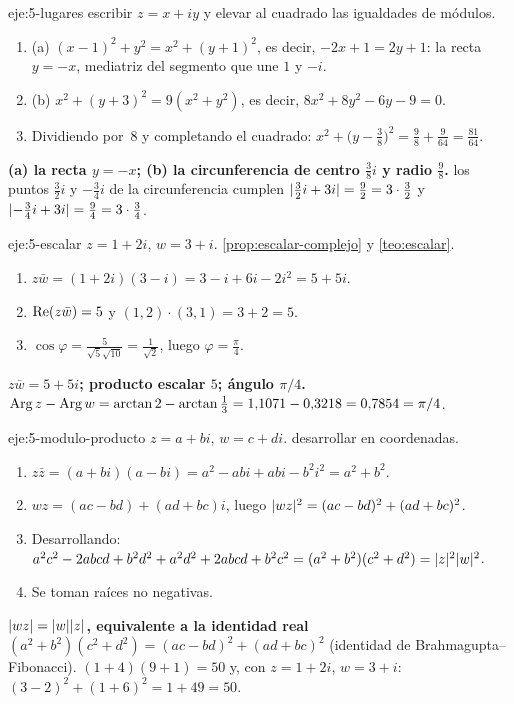 \begin{solucion}{eje:5-lugares}
\planteamiento escribir $z=x+iy$ y elevar al cuadrado las igualdades de módulos.
\pasos
\begin{enumerate}[label=\arabic*.]
  \item (a) $(x-1)^{2}+y^{2}=x^{2}+(y+1)^{2}$, es decir, $-2x+1=2y+1$: la recta $y=-x$, mediatriz del segmento que une $1$ y $-i$.
  \item (b) $x^{2}+(y+3)^{2}=9(x^{2}+y^{2})$, es decir, $8x^{2}+8y^{2}-6y-9=0$.
  \item Dividiendo por~8 y completando el cuadrado: $x^{2}+\bigl(y-\frac38\bigr)^{2}=\frac98+\frac{9}{64}=\frac{81}{64}$.
\end{enumerate}
\resultado \textbf{(a) la recta $y=-x$; (b) la circunferencia de centro $\frac38i$ y radio $\frac98$.}
\comprobacion los puntos $\frac32i$ y $-\frac34i$ de la circunferencia cumplen $\lvert\frac32i+3i\rvert=\frac92=3\cdot\frac32$ y $\lvert-\frac34i+3i\rvert=\frac94=3\cdot\frac34$.
\end{solucion}

\begin{solucion}{eje:5-escalar}
\datos $z=1+2i$, $w=3+i$.
\planteamiento \cref{prop:escalar-complejo} y \cref{teo:escalar}.
\pasos
\begin{enumerate}[label=\arabic*.]
  \item $z\bar w=(1+2i)(3-i)=3-i+6i-2i^{2}=5+5i$.
  \item $\operatorname{Re}(z\bar w)=5$ y $(1,2)\cdot(3,1)=3+2=5$.
  \item $\cos\varphi=\frac{5}{\sqrt5\sqrt{10}}=\frac{1}{\sqrt2}$, luego $\varphi=\frac{\pi}{4}$.
\end{enumerate}
\resultado \textbf{$z\bar w=5+5i$; producto escalar $5$; ángulo $\pi/4$.}
\comprobacion $\operatorname{Arg} z-\operatorname{Arg} w=\arctan2-\arctan\frac13=1{,}1071-0{,}3218=0{,}7854=\pi/4$.
\end{solucion}

\begin{solucion}{eje:5-modulo-producto}
\datos $z=a+bi$, $w=c+di$.
\planteamiento desarrollar en coordenadas.
\pasos
\begin{enumerate}[label=\arabic*.]
  \item $z\bar z=(a+bi)(a-bi)=a^{2}-abi+abi-b^{2}i^{2}=a^{2}+b^{2}$.
  \item $wz=(ac-bd)+(ad+bc)i$, luego $\lvert wz\rvert^{2}=(ac-bd)^{2}+(ad+bc)^{2}$.
  \item Desarrollando: $a^{2}c^{2}-2abcd+b^{2}d^{2}+a^{2}d^{2}+2abcd+b^{2}c^{2}=(a^{2}+b^{2})(c^{2}+d^{2})=\lvert z\rvert^{2}\lvert w\rvert^{2}$.
  \item Se toman raíces no negativas.
\end{enumerate}
\resultado \textbf{$\lvert wz\rvert=\lvert w\rvert\lvert z\rvert$, equivalente a la identidad real $(a^{2}+b^{2})(c^{2}+d^{2})=(ac-bd)^{2}+(ad+bc)^{2}$} (identidad de Brahmagupta--Fibonacci).
\comprobacion $(1+4)(9+1)=50$ y, con $z=1+2i$, $w=3+i$: $(3-2)^{2}+(1+6)^{2}=1+49=50$.
\end{solucion}

